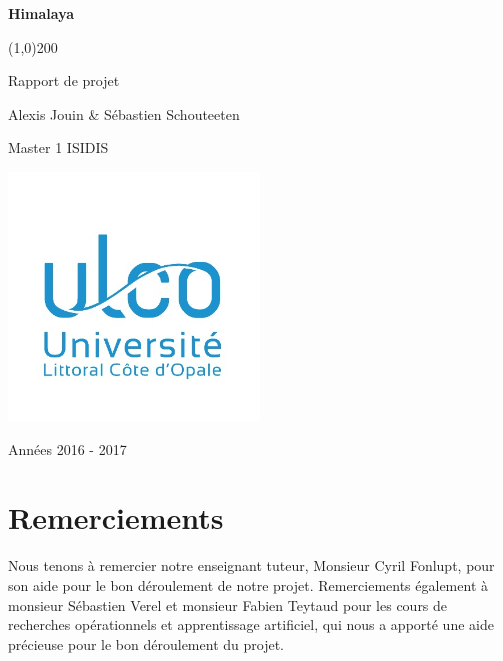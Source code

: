 \documentclass[french]{scrartcl}
\begin{document}
	
\begin{titlepage}
	\begin{center}
		\vspace*{2cm}
		
		\Huge
		\textbf{Himalaya}
		
		\line(1,0){200}
		
		\vspace{0.5cm}
		\LARGE
		Rapport de projet
		
		\vspace{4.5cm}
		
		\large
		Alexis Jouin \& Sébastien Schouteeten
		
		\vspace{0.5cm}
		Master 1 ISIDIS
		
		\vfill
		
		\includegraphics[width=0.5\textwidth]{images/ulco}
		
		\vspace{0.8cm}
		
		\Large
		Années 2016 - 2017
		
	\end{center}
\end{titlepage}

\newpage

\tableofcontents

\newpage

\section{Remerciements}
Nous tenons à remercier notre enseignant tuteur, Monsieur Cyril Fonlupt, pour son aide pour le bon déroulement de notre projet. Remerciements également à monsieur Sébastien Verel et monsieur Fabien Teytaud pour les cours de recherches opérationnels et apprentissage artificiel, qui nous a apporté une aide précieuse pour le bon déroulement du projet.

\newpage



\newpage



\newpage






\newpage


\newpage


\newpage

\end{document}
